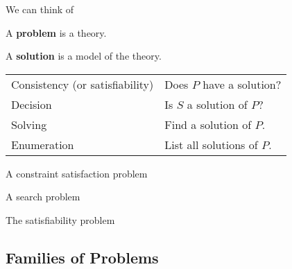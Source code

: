 \begin{remark}
We can think of 
\end{remark}

\begin{definition}
A \textbf{problem} is a theory.

A \textbf{solution} is a model of the theory.
\end{definition}

\begin{center}
\begin{tabular}{ll}
Consistency (or satisfiability) & Does $P$ have a solution?\\
Decision & Is $S$ a solution of $P$? \\
Solving & Find a solution of $P$.\\
Enumeration & List all solutions of $P$.\\
\end{tabular}
\end{center}

\begin{example}
A constraint satisfaction problem

\end{example}

\begin{example}
A search problem
\end{example}

\begin{example}
The satisfiability problem

\end{example}

\subsection{Families of Problems}

%
